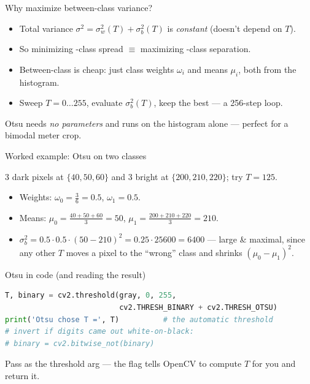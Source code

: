 \documentclass[10pt,aspectratio=169]{beamer}
\begin{document}
\begin{frame}{Why maximize between-class variance?}
  \begin{itemize}
    \item Total variance $\sigma^2 = \sigma_w^2(T) + \sigma_b^2(T)$ is \emph{constant} (doesn't depend on $T$).
    \item So minimizing -class spread $\equiv$ maximizing -class separation.
    \item Between-class is cheap: just class weights $\omega_i$ and means $\mu_i$, both from the histogram.
    \item Sweep $T=0\ldots255$, evaluate $\sigma_b^2(T)$, keep the best — a 256-step loop.
  \end{itemize}
  \begin{goodbox}
    Otsu needs \emph{no parameters} and runs on the histogram alone — perfect for a bimodal meter crop.
  \end{goodbox}
\end{frame}

\begin{frame}{Worked example: Otsu on two classes}
  \begin{mathbox}
    3 dark pixels at $\{40,50,60\}$ and 3 bright at $\{200,210,220\}$; try $T=125$.
  \end{mathbox}
  \begin{itemize}
    \item Weights: $\omega_0=\tfrac{3}{6}=0.5$, $\omega_1=0.5$.
    \item Means: $\mu_0=\tfrac{40+50+60}{3}=50$, $\mu_1=\tfrac{200+210+220}{3}=210$.
    \item $\sigma_b^2 = 0.5\cdot0.5\cdot(50-210)^2 = 0.25\cdot 25600 = 6400$ — large \& maximal, since any other $T$
          moves a pixel to the ``wrong'' class and shrinks $(\mu_0-\mu_1)^2$.
  \end{itemize}
\end{frame}

\begin{frame}[fragile]{Otsu in code (and reading the result)}
\begin{lstlisting}[language=Python]
T, binary = cv2.threshold(gray, 0, 255,
                          cv2.THRESH_BINARY + cv2.THRESH_OTSU)
print('Otsu chose T =', T)          # the automatic threshold
# invert if digits came out white-on-black:
# binary = cv2.bitwise_not(binary)
\end{lstlisting}
  \begin{infobox}
    Pass  as the threshold arg — the  flag tells OpenCV to compute $T$ for you and return it.
  \end{infobox}
\end{frame}
\end{document}

